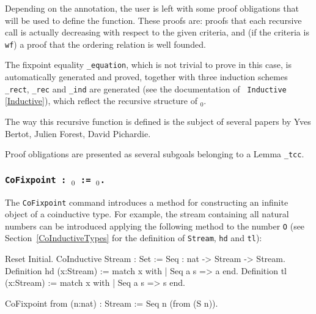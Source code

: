 Depending on the annotation, the user is left with some proof
obligations that will be used to define the function. These proofs
are: proofs that each recursive call is actually decreasing with
respect to the given criteria, and (if the criteria is \texttt{wf}) a
proof that the ordering relation is well founded.


The fixpoint equality  \texttt{\ident\_equation}, which is not trivial
to prove in this case, is automatically generated and proved, together
with three  induction schemes {\tt\ident\_rect},  {\tt\ident\_rec} and
{\tt\ident\_ind}  are   generated  (see  the   documentation  of  {\tt
  Inductive} \ref{Inductive}), which  reflect the recursive structure
of \term$_0$.



The way this recursive function is defined is the subject of several
papers by Yves Bertot, Julien Forest, David Pichardie.


\bigskip

 Proof obligations are presented as several
subgoals belonging to a Lemma {\ident}{\tt\_tcc}. %









\subsubsection{\tt CoFixpoint {\ident} : \type$_0$ := \term$_0$.
\label{CoFixpoint}}

The {\tt CoFixpoint} command introduces a method for constructing an
infinite object of a coinduc\-tive type. For example, the stream
containing all natural numbers can be introduced applying the
following method to the number \texttt{O} (see
Section~\ref{CoInductiveTypes} for the definition of {\tt Stream},
{\tt hd} and {\tt tl}):
\begin{coq_eval}
Reset Initial.
CoInductive Stream : Set :=
    Seq : nat -> Stream -> Stream.
Definition hd (x:Stream) := match x with
                            | Seq a s => a
                            end.
Definition tl (x:Stream) := match x with
                            | Seq a s => s
                            end.
\end{coq_eval}
\begin{coq_example}
CoFixpoint from (n:nat) : Stream := Seq n (from (S n)).
\end{coq_example}

